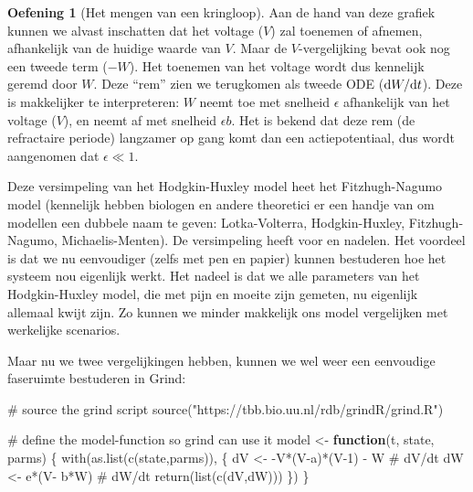 \documentclass[
  a4paper,
]{scrbook}
\newenvironment{Shaded}{\begin{snugshade}}{\end{snugshade}}
\newcommand{\CommentTok}[1]{\textcolor[rgb]{0.37,0.37,0.37}{#1}}
\newcommand{\ControlFlowTok}[1]{\textcolor[rgb]{0.00,0.23,0.31}{\textbf{#1}}}
\newcommand{\DecValTok}[1]{\textcolor[rgb]{0.68,0.00,0.00}{#1}}
\newcommand{\FunctionTok}[1]{\textcolor[rgb]{0.28,0.35,0.67}{#1}}
\newcommand{\NormalTok}[1]{\textcolor[rgb]{0.00,0.23,0.31}{#1}}
\newcommand{\OtherTok}[1]{\textcolor[rgb]{0.00,0.23,0.31}{#1}}
\newcommand{\SpecialCharTok}[1]{\textcolor[rgb]{0.37,0.37,0.37}{#1}}
\newcommand{\StringTok}[1]{\textcolor[rgb]{0.13,0.47,0.30}{#1}}
\theoremstyle{definition}
\newtheorem{exercise}{Oefening}[chapter]
\theoremstyle{remark}
\begin{document}
\begin{exercise}[Het mengen van een
kringloop]
Aan de hand van deze grafiek kunnen we alvast inschatten dat het voltage
(\(V\)) zal toenemen of afnemen, afhankelijk van de huidige waarde van
\(V\). Maar de \(V\)-vergelijking bevat ook nog een tweede term
(\(-W\)). Het toenemen van het voltage wordt dus kennelijk geremd door
\(W\). Deze ``rem'' zien we terugkomen als tweede ODE
(\(\mathchoice{\frac{\mathrm{d}W}
{\mathrm{d}t}}{\mathrm{d}W/\mathrm{d}t}
{\mathrm{d}W/\mathrm{d}t}
{\mathrm{d}W/\mathrm{d}t}\)). Deze is makkelijker te interpreteren:
\(W\) neemt toe met snelheid \(\epsilon\) afhankelijk van het voltage
(\(V\)), en neemt af met snelheid \(\epsilon b\). Het is bekend dat deze
rem (de refractaire periode) langzamer op gang komt dan een
actiepotentiaal, dus wordt aangenomen dat \(\epsilon \ll 1\).

Deze versimpeling van het Hodgkin-Huxley model heet het Fitzhugh-Nagumo
model (kennelijk hebben biologen en andere theoretici er een handje van
om modellen een dubbele naam te geven: Lotka-Volterra, Hodgkin-Huxley,
Fitzhugh-Nagumo, Michaelis-Menten). De versimpeling heeft voor en
nadelen. Het voordeel is dat we nu eenvoudiger (zelfs met pen en papier)
kunnen bestuderen hoe het systeem nou eigenlijk werkt. Het nadeel is dat
we alle parameters van het Hodgkin-Huxley model, die met pijn en moeite
zijn gemeten, nu eigenlijk allemaal kwijt zijn. Zo kunnen we minder
makkelijk ons model vergelijken met werkelijke scenarios.

Maar nu we twee vergelijkingen hebben, kunnen we wel weer een eenvoudige
faseruimte bestuderen in Grind:

\begin{Shaded}
\begin{Highlighting}[]
\CommentTok{\# source the grind script}
\FunctionTok{source}\NormalTok{(}\StringTok{"https://tbb.bio.uu.nl/rdb/grindR/grind.R"}\NormalTok{)}

\CommentTok{\# define the model{-}function so grind can use it}
\NormalTok{model }\OtherTok{\textless{}{-}} \ControlFlowTok{function}\NormalTok{(t, state, parms) \{}
  \FunctionTok{with}\NormalTok{(}\FunctionTok{as.list}\NormalTok{(}\FunctionTok{c}\NormalTok{(state,parms)), \{}
\NormalTok{    dV }\OtherTok{\textless{}{-}} \SpecialCharTok{{-}}\NormalTok{V}\SpecialCharTok{*}\NormalTok{(V}\SpecialCharTok{{-}}\NormalTok{a)}\SpecialCharTok{*}\NormalTok{(V}\DecValTok{{-}1}\NormalTok{) }\SpecialCharTok{{-}}\NormalTok{ W  }\CommentTok{\# dV/dt}
\NormalTok{    dW }\OtherTok{\textless{}{-}}\NormalTok{ e}\SpecialCharTok{*}\NormalTok{(V}\SpecialCharTok{{-}}\NormalTok{ b}\SpecialCharTok{*}\NormalTok{W)         }\CommentTok{\# dW/dt }
    \FunctionTok{return}\NormalTok{(}\FunctionTok{list}\NormalTok{(}\FunctionTok{c}\NormalTok{(dV,dW)))  }
\NormalTok{  \}) }
\NormalTok{\}}


\end{Highlighting}
\end{Shaded}
\end{exercise}
\end{document}
